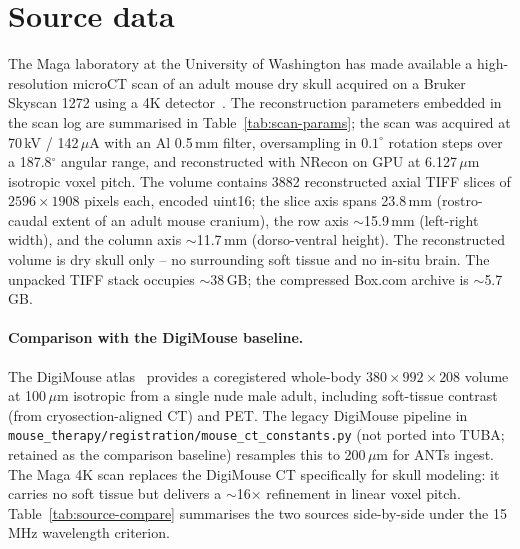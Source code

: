 \documentclass{compactarticle}
\begin{document}
\section{Source data}
\label{sec:source}

The Maga laboratory at the University of Washington has made
available a high-resolution microCT scan of an adult mouse dry skull
acquired on a Bruker Skyscan 1272 using a 4K detector~\cite{maga-uw}.
The reconstruction parameters embedded in the scan log are summarised
in Table~\ref{tab:scan-params}; the scan was acquired at 70\,kV /
142\,$\mu$A with an Al 0.5\,mm filter, oversampling in $0.1^\circ$
rotation steps over a 187.8$^\circ$ angular range, and reconstructed
with NRecon on GPU at 6.127\,$\mu$m isotropic voxel pitch. The volume
contains 3882 reconstructed axial TIFF slices of $2596 \times 1908$
pixels each, encoded uint16; the slice axis spans 23.8\,mm
(rostro-caudal extent of an adult mouse cranium), the row axis
$\sim$15.9\,mm (left-right width), and the column axis $\sim$11.7\,mm
(dorso-ventral height). The reconstructed volume is dry skull only --
no surrounding soft tissue and no in-situ brain. The unpacked TIFF
stack occupies $\sim$38\,GB; the compressed Box.com archive is
$\sim$5.7\,GB.

\begin{table}[H]
\centering
\caption{Maga 4K skull scan parameters (from embedded NRecon log).}
\label{tab:scan-params}
\small

\end{table}

\paragraph{Comparison with the DigiMouse baseline.} The DigiMouse
atlas~\cite{digimouse} provides a coregistered whole-body $380 \times 992
\times 208$ volume at 100\,$\mu$m isotropic from a single nude male
adult, including soft-tissue contrast (from cryosection-aligned CT)
and PET. The legacy DigiMouse pipeline in
\texttt{mouse\_therapy/\allowbreak registration/\allowbreak mouse\_ct\_constants.py}
(not ported into TUBA; retained as the comparison baseline)
resamples this to
200\,$\mu$m for ANTs ingest. The Maga 4K scan replaces the DigiMouse
CT specifically for skull modeling: it carries no soft tissue but
delivers a $\sim$16$\times$ refinement in linear voxel pitch.
Table~\ref{tab:source-compare} summarises the two sources side-by-side
under the 15\,MHz wavelength criterion.
\end{document}
